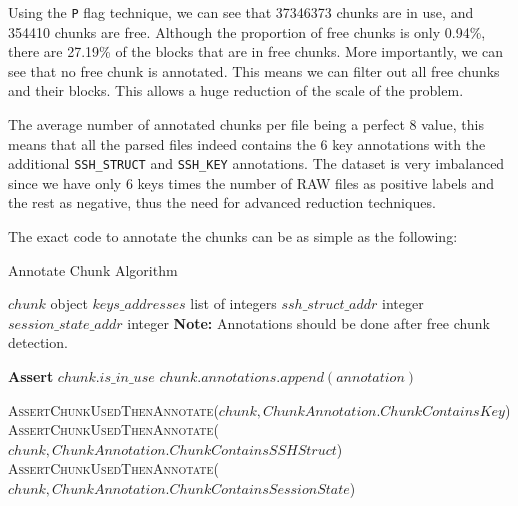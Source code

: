     Using the \texttt{P} flag technique, we can see that 37346373 chunks are in use, and 354410 chunks are free. Although the proportion of free chunks is only 0.94\%, there are 27.19\% of the blocks that are in free chunks. More importantly, we can see that no free chunk is annotated. This means we can filter out all free chunks and their blocks. This allows a huge reduction of the scale of the problem. 
    
    The average number of annotated chunks per file being a perfect 8 value, this means that all the parsed files indeed contains the 6 key annotations with the additional \texttt{SSH\_STRUCT} and \texttt{SSH\_KEY} annotations. The dataset is very imbalanced since we have only 6 keys times the number of RAW files as positive labels and the rest as negative, thus the need for advanced reduction techniques. 
    
    The exact code to annotate the chunks can be as simple as the following:

    \begin{algorithm}[H]
        \caption{Annotate Chunk Algorithm}
        \begin{algorithmic}[1]
            \Ensure $chunk$ object
            \Ensure $keys\_addresses$ list of integers
            \Ensure $ssh\_struct\_addr$ integer
            \Ensure $session\_state\_addr$ integer
            \State \textbf{Note:} Annotations should be done after free chunk detection.
            
                \State \textbf{Assert} $chunk.is\_in\_use$ 
                \State $chunk.annotations.append(annotation)$
            \EndProcedure
            
                \State \textsc{AssertChunkUsedThenAnnotate}($chunk, ChunkAnnotation.ChunkContainsKey$)
                \State \textsc{AssertChunkUsedThenAnnotate}($chunk, ChunkAnnotation.ChunkContainsSSHStruct$)
                \State \textsc{AssertChunkUsedThenAnnotate}($chunk, ChunkAnnotation.ChunkContainsSessionState$)
            \EndIf
        \EndProcedure
        \end{algorithmic}
    \end{algorithm}
    
